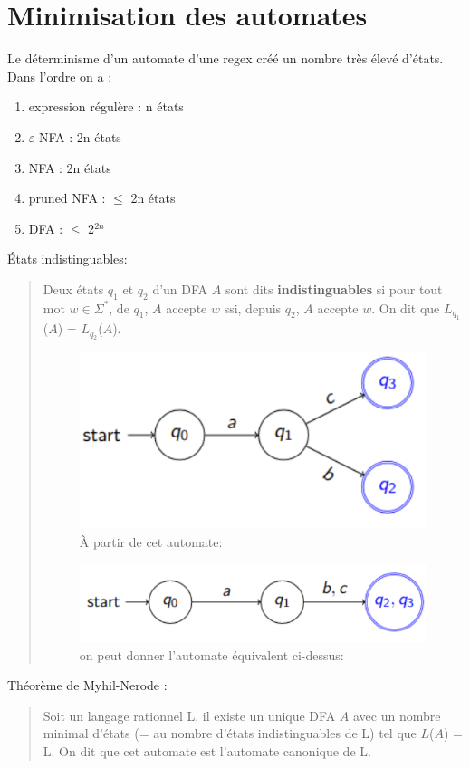 \documentclass{article}
\begin{document}
\section{Minimisation des automates}
Le déterminisme d'un automate d'une regex créé un nombre très élevé d'états. Dans l'ordre on a :
\begin{enumerate}
    \item expression régulère : n états
    \item $\varepsilon$-NFA : 2n états
    \item NFA : 2n états
    \item pruned NFA : $\leqslant$ 2n états
    \item DFA : $\leqslant$ 2$^{2n}$
\end{enumerate}

États indistinguables:
\begin{quote}
    Deux états $q_{1}$ et $q_{2}$ d'un DFA $A$ sont dits \textbf{indistinguables} si pour tout mot $w \in \Sigma^{*}$, de $q_{1}$, $A$ accepte $w$ ssi, depuis $q_{2}$, $A$ accepte $w$. On dit que $L_{q_{1}}$($A$) = $L_{q_{2}}$($A$).
    
    \begin{figure}[h]
        \centering
        \includegraphics[scale=0.3]{Image15.png}
        \caption{À partir de cet automate:}
    \end{figure}
    
    \begin{figure}[h]
        \centering
        \includegraphics[scale=0.3]{Image16.png}
        \caption{on peut donner l'automate équivalent ci-dessus:}
    \end{figure}
\end{quote}
Théorème de Myhil-Nerode :
\begin{quote}
    Soit un langage rationnel L, il existe un unique DFA $A$ avec un nombre minimal d'états (= au nombre d'états indistinguables de L) tel que $L$($A$) = L. On dit que cet automate est l'automate canonique de L.
\end{quote}
\end{document}
